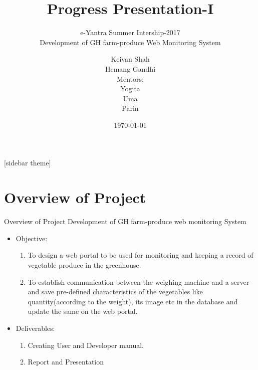 \documentclass[10pt, a4paper]{beamer}
\begin{document}
    \title{Progress Presentation-I}
    \subtitle{e-Yantra Summer Intership-2017 \\ Development of GH farm-produce Web Monitoring System}
    \author{Keivan Shah\\Hemang Gandhi\\
    Mentors: \\Yogita\\Uma\\Parin}
    \date{\today}
    \frame{\titlepage}

[sidebar theme]
\section{Overview of Project}
\begin{frame}{Overview of Project}
    Development of GH farm-produce web monitoring System \\
    \begin{itemize}
        \item Objective: \\
        \begin{enumerate}
            \item To design a web portal to be used for monitoring and  keeping a record of vegetable produce in  the greenhouse.
            \item To establish communication between the weighing machine and a server and save pre-defined characteristics of the vegetables like quantity(according to the weight), its image etc in the database and update the same on the web portal.
        \end{enumerate}
        \item Deliverables:\\
        \begin{enumerate}
            \item Creating User and Developer manual.
            \item Report and Presentation
        \end{enumerate}
    \end{itemize}
\end{frame}
\end{document}
